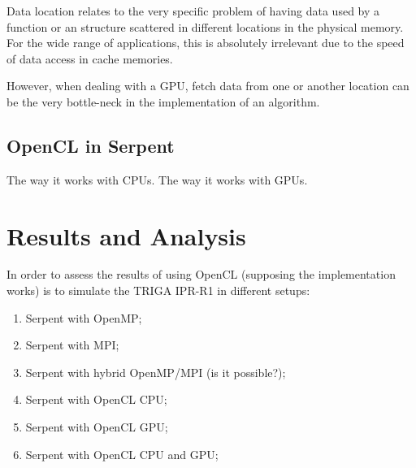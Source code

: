 \documentclass[twoside,a4paper,12pt,english,draft]{anstrans}
\renewcommand{\vec}[1]{\bm{#1}} %
\newcommand{\vd}{\bm{\cdot}} %
\newcommand{\grad}{\vec{\nabla}} %
\newcommand{\ud}{\mathop{}\!\mathrm{d}} %
\begin{document}
Data location relates to the very specific problem of having data used by a function or an
structure scattered in different locations in the physical memory. For the wide range of
applications, this is absolutely irrelevant due to the speed of data access in cache memories.

However, when dealing with a GPU, fetch data from one or another location can be the very
bottle-neck in the implementation of an algorithm.

\subsection{OpenCL in Serpent}

The way it works with CPUs.
The way it works with GPUs.

\iffalse
\begin{subequations} \label{eqs:fullTransport}
\begin{multline} \label{eq:fullTransportVol}
  \vec{\Omega}\vd \grad \psi(\vec{x}, \vec{\Omega})
  + \sigma(\vec{x}) \psi (\vec{x}, \vec{\Omega})
\\ =
  \frac{\sigma_s(\vec{x})}{4\pi} \int_{4\pi} \psi(\vec{x},\vec{\Omega}')
  \ud\Omega' + \frac{q(\vec{x})}{4\pi}
  \equiv \frac{1}{4\pi} Q(\vec{x}) \,,
\end{multline}
inside $\vec{x} \in V$, $\vec{\Omega} \in 4\pi$, with an incident boundary
condition
\begin{equation} \label{eq:fullTransportBndy}
  \psi(\vec{x}, \vec{\Omega}) = \psi^b(\vec{x}, \vec{\Omega}) \,,
 \quad \vec{x} \in \partial V, \ \vec{\Omega} \vd \vec{n} < 0\,.
\end{equation}
\end{subequations}
\fi

\section{Results and Analysis}

In order to assess the results of using OpenCL (supposing the implementation works)
is to simulate the TRIGA IPR-R1 in different setups:
\begin{enumerate}
\item Serpent with OpenMP;
\item Serpent with MPI;
\item Serpent with hybrid OpenMP/MPI (is it possible?);
\item Serpent with OpenCL CPU;
\item Serpent with OpenCL GPU;
  \item Serpent with OpenCL CPU and GPU;
  \end{enumerate}
\end{document}
